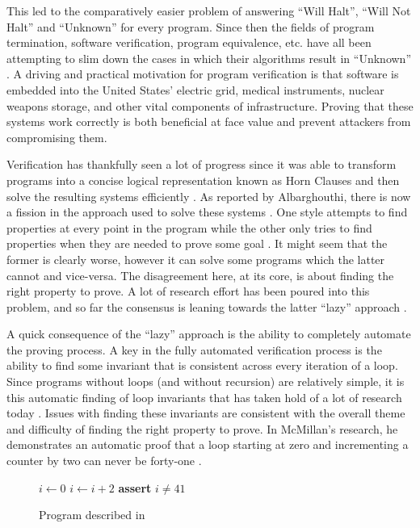\documentclass[letterpaper,twocolumn,10pt]{article}
\begin{document}
This led to the comparatively easier problem of answering ``Will Halt'', ``Will
Not Halt'' and ``Unknown'' for every program.
Since then the fields of program termination, software verification,
program equivalence, etc. have all been attempting to slim down the cases in
which their algorithms result in ``Unknown''
\cite{program-termination} \cite{harris} \cite{do-good}.
A driving and practical motivation for program verification is that software
is embedded into the United States' electric grid, medical instruments,
nuclear weapons storage, and other vital components of infrastructure.
Proving that these systems work correctly is both beneficial at face
value and prevent attackers from compromising them.

Verification has thankfully seen a lot of progress since it was able to transform
programs into a concise logical representation known as Horn Clauses and then
solve the resulting systems efficiently ​\cite{solving-horn-inter}.
As reported by Albarghouthi, there is now a fission in the
approach used to solve these systems ​\cite{under-over-approx}.
One style attempts to find properties at every point in the program while the
other only tries to find properties when they are needed to prove some goal
\cite{under-over-approx}.
It might seem that the former is clearly worse, however it can
solve some programs which the latter cannot and vice-versa.
The disagreement here, at its core, is about finding the right property to
prove. A lot of research effort has been poured into this problem, and so far
the consensus is leaning towards the latter ``lazy'' approach
\cite{under-over-approx} \cite{solving-horn-inter} \cite{lazy-interpolants}.

A quick consequence of the ``lazy'' approach is the ability to completely
automate the proving process. A key in the fully automated verification process
is the ability to find some invariant that is consistent across every iteration
of a loop. Since programs without loops (and without recursion) are relatively
simple, it is this automatic finding of loop invariants that has taken hold of
a lot of research today \cite{solving-horn-inter} \cite{harris}.
Issues with finding these invariants are consistent with the overall theme
and difficulty of finding the right property to prove.
In McMillan’s research, he demonstrates an automatic proof that a loop starting
at zero and incrementing a counter by two can never be forty-one
\cite{solving-horn-inter}.

\begin{figure}[h]
\begin{algorithmic}
\State $i \gets 0$
  \State $i \gets i + 2$
\EndWhile
\State \textbf{assert} $i \neq 41$
\EndFunction
\end{algorithmic}
\caption{Program described in \cite{solving-horn-inter}}
\end{figure}
\end{document}
